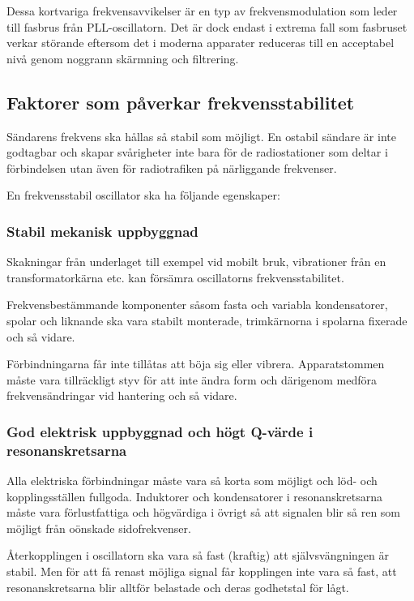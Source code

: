 Dessa kortvariga frekvensavvikelser är en typ av frekvensmodulation
som leder till fasbrus från PLL-oscillatorn.
Det är dock endast i extrema fall som fasbruset verkar störande eftersom det
i moderna apparater reduceras till en acceptabel nivå genom noggrann
skärmning och filtrering.

\subsection{Faktorer som påverkar frekvensstabilitet}

Sändarens frekvens ska hållas så stabil som möjligt.
En ostabil sändare är inte godtagbar och skapar svårigheter inte bara för de
radiostationer som deltar i förbindelsen utan även för radiotrafiken
på närliggande frekvenser.

En frekvensstabil oscillator ska ha följande egenskaper:

\newpage %
\subsubsection{Stabil mekanisk uppbyggnad}

Skakningar från underlaget till exempel vid mobilt bruk, vibrationer från en
transformatorkärna etc. kan försämra oscillatorns frekvensstabilitet.

Frekvensbestämmande komponenter såsom fasta och variabla kondensatorer, spolar
och liknande ska vara stabilt monterade, trimkärnorna i spolarna fixerade och 
så vidare.

Förbindningarna får inte tillåtas att böja sig eller vibrera.
Apparatstommen måste vara tillräckligt styv för att inte ändra form och
därigenom medföra frekvensändringar vid hantering och så vidare.

\subsubsection{God elektrisk uppbyggnad och högt Q-värde i resonanskretsarna}

Alla elektriska förbindningar måste vara så korta som möjligt och löd- och
kopplingsställen fullgoda.
Induktorer och kondensatorer i resonanskretsarna måste vara förlustfattiga
och högvärdiga i övrigt så att signalen blir så ren som möjligt från oönskade
sidofrekvenser.

Återkopplingen i oscillatorn ska vara så fast (kraftig) att självsvängningen
är stabil.
Men för att få renast möjliga signal får kopplingen inte vara så fast,
att resonanskretsarna blir alltför belastade och deras godhetstal för lågt.

